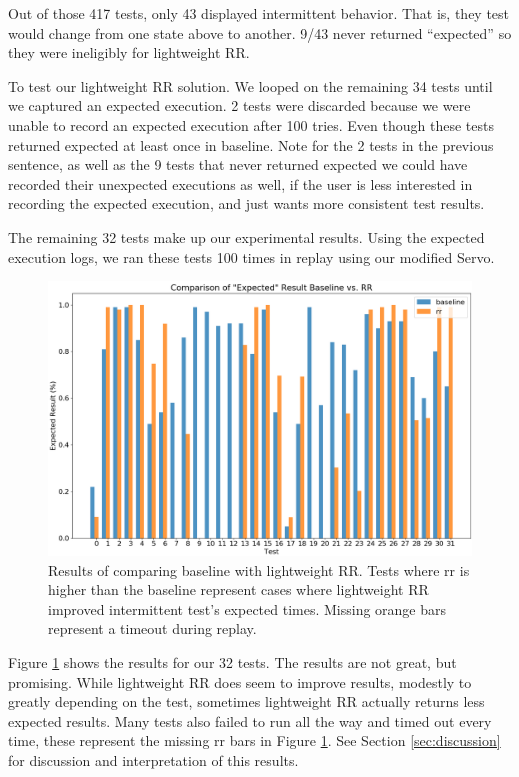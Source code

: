 \documentclass{article}
\begin{document}
Out of those 417 tests, only 43 displayed intermittent behavior. That is, they test
would change from one state above to another. 9/43 never returned
``expected'' so they were ineligibly for lightweight RR.

To test our lightweight RR solution. We looped on the remaining 34 tests until
we captured an expected execution. 2 tests were
discarded because we were unable to record an expected execution after 100
tries. Even though these tests returned expected at least once in baseline. Note
for the 2 tests in the previous sentence, as well as the 9 tests that never returned
expected we could have recorded their unexpected executions as well, if the user
is less interested in recording the expected execution, and just wants more consistent
test results.

The remaining 32 tests make up our experimental results. Using the expected execution
logs, we ran these tests 100 times in replay using our modified Servo.

\begin{figure}
  \includegraphics[width=\linewidth]{result_comparison.png}
  \caption{Results of comparing baseline with lightweight RR. Tests where rr
    is higher than the baseline represent cases where lightweight RR improved intermittent
    test's expected times. Missing orange bars represent a timeout during replay. }
  \label{fig:result1}
\end{figure}

Figure \ref{fig:result1} shows the results for our 32 tests. The results are
not great, but promising. While lightweight RR does seem to improve results,
modestly to greatly depending on the test, sometimes lightweight RR actually returns
less expected results. Many tests also failed to run all the way and timed out
every time, these represent the missing rr bars in Figure \ref{fig:result1}. See Section \ref{sec:discussion} for discussion and interpretation of this results.
\end{document}
